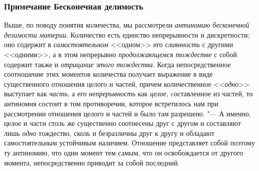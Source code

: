 \subsubsection[Примечание Бесконечная делимость]{Примечание Бесконечная делимость}

Выше, по поводу понятия количества, мы рассмотрели
{\em антиномию бесконечной делимости материи}.
Количество есть единство непрерывности и дискретности; оно содержит в
{\em самостоятельном} <<одном>> его
{\em слиянность} с другими <<одними>>, а в этом
непрерывно {\em продолжающемся тождестве} с собой
содержит также и {\em отрицание этого тождества}. Когда
непосредственное соотношение этих моментов количества получает выражение в
виде существенного отношения целого и частей, причем количественное
<<{\em одно}>> выступает как {\em часть}, а его
{\em непрерывность} как {\em целое}, cоставленное из частей, то антиномия
состоит в том противоречии, которое встретилось нам при рассмотрении
отношения целого и частей и было там разрешено. "--- А именно, целое и части
столь же существенно соотнесены друг с другом и составляют лишь
{\em одно} тождество, сколь и безразличны друг к другу
и обладают самостоятельным устойчивым наличием. Отношение представляет
собой поэтому ту антиномию, что один момент тем самым, что он освобождается
от другого момента, непосредственно приводит за собой последний.

